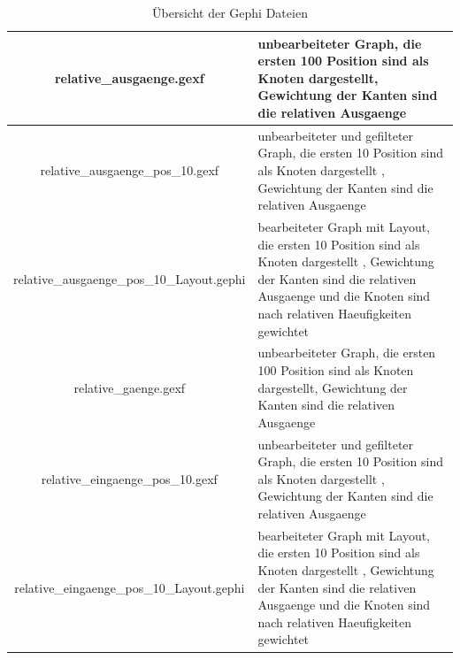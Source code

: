 \begin{table}[H]
    \begin{center}
        \begin{tabular}{|c|p{7cm}|} 
            \hline  relative\_ausgaenge.gexf  & unbearbeiteter Graph, die ersten 100 Position sind als Knoten dargestellt, Gewichtung der Kanten sind die relativen Ausgaenge \\
            \hline  relative\_ausgaenge\_pos\_10.gexf  & unbearbeiteter und gefilteter Graph, die ersten 10 Position sind als Knoten dargestellt , Gewichtung der Kanten sind die relativen Ausgaenge \\
            \hline  relative\_ausgaenge\_pos\_10\_Layout.gephi  & bearbeiteter Graph mit Layout, die ersten 10 Position sind als Knoten dargestellt , Gewichtung der Kanten sind die relativen Ausgaenge und die Knoten sind nach relativen Haeufigkeiten gewichtet\\
            \hline  relative\_gaenge.gexf  & unbearbeiteter Graph, die ersten 100 Position sind als Knoten dargestellt, Gewichtung der Kanten sind die relativen Ausgaenge \\  
            \hline  relative\_eingaenge\_pos\_10.gexf  & unbearbeiteter und gefilteter Graph, die ersten 10 Position sind als Knoten dargestellt , Gewichtung der Kanten sind die relativen Ausgaenge \\
            \hline relative\_eingaenge\_pos\_10\_Layout.gephi  & bearbeiteter Graph mit Layout, die ersten 10 Position sind als Knoten dargestellt , Gewichtung der Kanten sind die relativen Ausgaenge und die Knoten sind nach relativen Haeufigkeiten gewichtet \\     
            \hline
        \end{tabular} 
    \end{center}
    \caption{Übersicht der Gephi Dateien}\label{Gephi_dateien}
\end{table}

